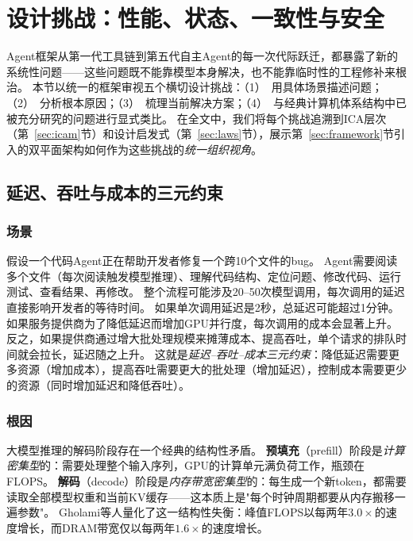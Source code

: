 \section{设计挑战：性能、状态、一致性与安全}
\label{sec:challenges}

Agent框架从第一代工具链到第五代自主Agent的每一次代际跃迁，都暴露了新的系统性问题——这些问题既不能靠模型本身解决，也不能靠临时性的工程修补来根治。
本节以统一的框架审视五个横切设计挑战：（1）~用具体场景描述问题；（2）~分析根本原因；（3）~梳理当前解决方案；（4）~与经典计算机体系结构中已被充分研究的问题进行显式类比。
在全文中，我们将每个挑战追溯到ICA层次（第~\ref{sec:icam}节）和设计启发式（第~\ref{sec:laws}节），展示第~\ref{sec:framework}节引入的双平面架构如何作为这些挑战的\emph{统一组织视角}。


\subsection{延迟、吞吐与成本的三元约束}

\subsubsection{场景}
假设一个代码Agent正在帮助开发者修复一个跨10个文件的bug。
Agent需要阅读多个文件（每次阅读触发模型推理）、理解代码结构、定位问题、修改代码、运行测试、查看结果、再修改。
整个流程可能涉及20--50次模型调用，每次调用的延迟直接影响开发者的等待时间。
如果单次调用延迟是2秒，总延迟可能超过1分钟。
如果服务提供商为了降低延迟而增加GPU并行度，每次调用的成本会显著上升。
反之，如果提供商通过增大批处理规模来摊薄成本、提高吞吐，单个请求的排队时间就会拉长，延迟随之上升。
这就是\emph{延迟--吞吐--成本三元约束}：降低延迟需要更多资源（增加成本），提高吞吐需要更大的批处理（增加延迟），控制成本需要更少的资源（同时增加延迟和降低吞吐）。

\subsubsection{根因}
大模型推理的解码阶段存在一个经典的结构性矛盾。
\textbf{预填充}（prefill）阶段是\emph{计算密集型}的：需要处理整个输入序列，GPU的计算单元满负荷工作，瓶颈在FLOPS。
\textbf{解码}（decode）阶段是\emph{内存带宽密集型}的：每生成一个新token，都需要读取全部模型权重和当前KV缓存——这本质上是"每个时钟周期都要从内存搬移一遍参数"\cite{gholami2024memorywall}。
Gholami等人量化了这一结构性失衡：峰值FLOPS以每两年$3.0\times$的速度增长，而DRAM带宽仅以每两年$1.6\times$的速度增长\cite{gholami2024memorywall}。

